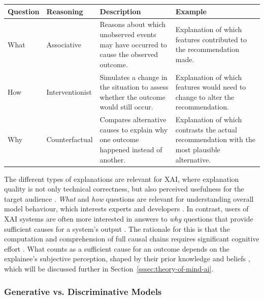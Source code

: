\begin{ctable}
    \centering
    \begin{tabularx}{\textwidth}{l l X X}
        \toprule
        \textbf{Question} & \textbf{Reasoning} & \textbf{Description} & \textbf{Example} \\
        \midrule
        What & Associative & Reasons about which unobserved events may have occurred to cause the observed outcome. & Explanation of which features contributed to the recommendation made. \\
        How & Interventionist & Simulates a change in the situation to assess whether the outcome would still occur. & Explanation of which features would need to change to alter the recommendation. \\
        Why & Counterfactual & Compares alternative causes to explain why one outcome happened instead of another. & Explanation of which contrasts the actual recommendation with the most plausible alternative. \\
        \bottomrule
    \end{tabularx}
    \caption[Types of Explanations]{Types of explanations as a product and associated reasoning, adapted from \textcite{Miller2019}.}
    \label{tab:question-types-explanations}
\end{ctable}


The different types of explanations are relevant for \ac{XAI}, where explanation quality is not only technical correctness, but also perceived usefulness for the target audience \parencite{Miller2019,Lombrozo2006}. \textit{What} and \textit{how} questions are relevant for understanding overall model behaviour, which interests experts and developers \parencite{Miller2019}. In contrast, users of \ac{XAI} systems are often more interested in answers to \textit{why} questions that provide sufficient causes for a system's output \parencite{Kelley1987}. The rationale for this is that the computation and comprehension of full causal chains requires significant cognitive effort \parencite{Lipton1990}. What counts as a sufficient cause for an outcome depends on the explainee's subjective perception, shaped by their prior knowledge and beliefs \parencite{Kashima1998}, which will be discussed further in Section~\ref{sssec:theory-of-mind-ai}.

\subsubsection{Generative vs. Discriminative Models} \label{sssec:generative-vs-discriminative}

